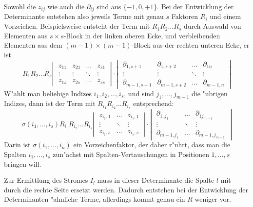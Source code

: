 Sowohl die $z_{ij}$ wie auch die $\partial_{ij}$ sind aus $\{-1,0,+1\}$.
Bei der Entwicklung der Determinante entstehen also jeweils Terme
mit genau $s$ Faktoren $R_i$ und einem Vorzeichen.
Beispielsweise entsteht der Term mit $R_1R_2\dots R_s$ durch
Auswahl von Elementen aus $s\times s$-Block in der linken oberen
Ecke, und verbleibenden Elementen aus dem $(m-1)\times (m-1)$-Block
aus der rechten unteren Ecke, er ist
\[
R_1R_2\dots R_s
\left|\;
\begin{matrix}
z_{11}       &z_{21}       &\dots &z_{s1}       \\
\vdots       &\vdots       &\ddots&\vdots       \\
z_{1s}       &z_{2s}       &\dots &z_{ss}       
\end{matrix}
\;\right|
\cdot
\left|\;
\begin{matrix}
\partial_{1,s+1}   &\partial_{1,s+2}   &\dots &\partial_{1n}   \\
\vdots             &\vdots             &\ddots&\vdots          \\
\partial_{m-1,s+1} &\partial_{m-1,s+2} &\dots &\partial_{m-1,n}
\end{matrix}
\;\right|
\]
W"ahlt man beliebige Indizes $i_1,i_2,\dots,i_s$, und sind $j_1,\dots,j_{m-1}$
die "ubrigen Indizes, dann ist der
Term mit $R_{i_1}R_{i_2}\dots R_{i_s}$ entsprechend:
\[
\sigma(i_1,\dots,i_s)
R_{i_1}R_{i_2}\dots R_{i_s}
\left|\;
\begin{matrix}
z_{i_1,1}    &\dots &z_{i_s,1}\\
\vdots       &\ddots&\vdots   \\
z_{i_1,s}    &\dots &z_{i_s,s}       
\end{matrix}
\;\right|
\cdot
\left|\;
\begin{matrix}
\partial_{1,j_1}   &\dots &\partial_{1j_{m-1}}   \\
\vdots             &\ddots&\vdots          \\
\partial_{m-1,j_1} &\dots &\partial_{m-1,j_{m-1}}
\end{matrix}
\;\right|
\]
Darin ist $\sigma(i_1,\dots,i_n)$ ein Vorzeichenfaktor, der
daher r"uhrt, dass man die Spalten $i_1,\dots,i_s$ zun"achst
mit Spalten-Vertauschungen in Positionen $1,\dots,s$ bringen
will.

Zur Ermittlung des Stromes $I_l$ muss in dieser Determinante die
Spalte $l$ mit durch die rechte Seite ersetzt werden. Dadurch
entstehen bei der Entwicklung der Determinanten "ahnliche Terme,
allerdings kommt genau ein $R$ weniger vor.

